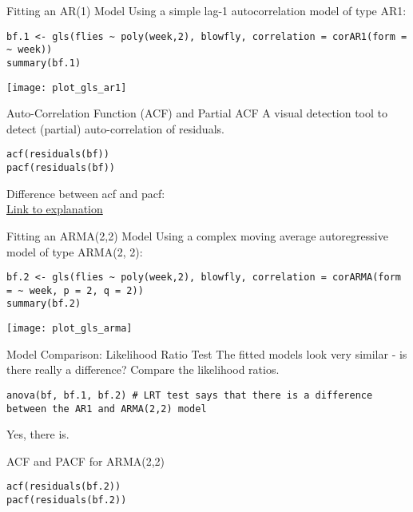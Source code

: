 \documentclass{beamer}
\begin{document}
\begin{frame}[fragile]{Fitting an AR(1) Model}
  Using a simple lag-1 autocorrelation model of type AR1:
  \begin{verbatim}
bf.1 <- gls(flies ~ poly(week,2), blowfly, correlation = corAR1(form = ~ week))
summary(bf.1)
  \end{verbatim}
  \begin{center}
    \texttt{[image: plot\_gls\_ar1]} %
  \end{center}
\end{frame}

\begin{frame}[fragile]{Auto-Correlation Function (ACF) and Partial ACF}
  A visual detection tool to detect (partial) auto-correlation of residuals.
  \begin{verbatim}
acf(residuals(bf))
pacf(residuals(bf))
  \end{verbatim}
  Difference between acf and pacf: \\
  \href{https://stats.stackexchange.com/questions/483383/difference-between-autocorrelation-and-partial-autocorrelation}{Link to explanation}
\end{frame}

\begin{frame}[fragile]{Fitting an ARMA(2,2) Model}
  Using a complex moving average autoregressive model of type ARMA(2, 2):
  \begin{verbatim}
bf.2 <- gls(flies ~ poly(week,2), blowfly, correlation = corARMA(form = ~ week, p = 2, q = 2))
summary(bf.2)
  \end{verbatim}
  \begin{center}
    \texttt{[image: plot\_gls\_arma]} %
  \end{center}
\end{frame}

\begin{frame}[fragile]{Model Comparison: Likelihood Ratio Test}
  The fitted models look very similar - is there really a difference? Compare the likelihood ratios.
  \begin{verbatim}
anova(bf, bf.1, bf.2) # LRT test says that there is a difference between the AR1 and ARMA(2,2) model
  \end{verbatim}
  Yes, there is.
\end{frame}

\begin{frame}[fragile]{ACF and PACF for ARMA(2,2)}
  \begin{verbatim}
acf(residuals(bf.2))
pacf(residuals(bf.2))
  \end{verbatim}
\end{frame}
\end{document}
